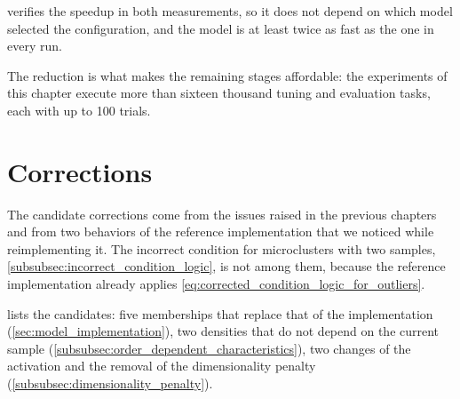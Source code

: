 

 verifies the speedup in both measurements, so it does not depend on which model selected the configuration, and the  model is at least twice as fast as the  one in every run.

The reduction is what makes the remaining stages affordable: the experiments of this chapter execute more than sixteen thousand tuning and evaluation tasks, each with up to 100 trials.

\section{Corrections}
\label{sec:mi_corrections}

The candidate corrections come from the issues raised in the previous chapters and from two behaviors of the reference implementation that we noticed while reimplementing it. The incorrect condition for microclusters with two samples, \cref{subsubsec:incorrect_condition_logic}, is not among them, because the reference implementation already applies \cref{eq:corrected_condition_logic_for_outliers}.

 lists the candidates: five memberships that replace that of the implementation (\cref{sec:model_implementation}), two densities that do not depend on the current sample (\cref{subsubsec:order_dependent_characteristics}), two changes of the activation and the removal of the dimensionality penalty (\cref{subsubsec:dimensionality_penalty}).

